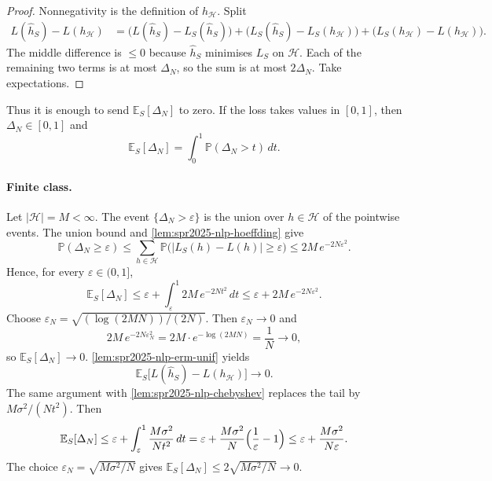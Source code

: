 \documentclass[11pt,a4paper]{article}
\theoremstyle{definition}
\begin{document}
\begin{proof}
Nonnegativity is the definition of \(h_{\mathcal{H}}\). Split
\begin{align*}
L(\widehat h_S)-L(h_{\mathcal{H}})
&=
\bigl(L(\widehat h_S)-L_S(\widehat h_S)\bigr)
+\bigl(L_S(\widehat h_S)-L_S(h_{\mathcal{H}})\bigr)
+\bigl(L_S(h_{\mathcal{H}})-L(h_{\mathcal{H}})\bigr).
\end{align*}
The middle difference is \(\le 0\) because \(\widehat h_S\) minimises \(L_S\) on \(\mathcal{H}\). Each of the remaining two terms is at most \(\Delta_N\), so the sum is at most \(2\Delta_N\). Take expectations.
\end{proof}

Thus it is enough to send \(\mathbb{E}_S[\Delta_N]\) to zero. If the loss takes values in \([0,1]\), then \(\Delta_N\in[0,1]\) and
\[
\mathbb{E}_S[\Delta_N]
=\int_0^1\mathbb{P}(\Delta_N>t)\,dt.
\]

\paragraph{Finite class.}
Let \(\lvert\mathcal{H}\rvert=M<\infty\). The event \(\{\Delta_N>\varepsilon\}\) is the union over \(h\in\mathcal{H}\) of the pointwise events. The union bound and \cref{lem:spr2025-nlp-hoeffding} give
\[
\mathbb{P}(\Delta_N\ge\varepsilon)
\le
\sum_{h\in\mathcal{H}}\mathbb{P}\bigl(\lvert L_S(h)-L(h)\rvert\ge\varepsilon\bigr)
\le
2M\,e^{-2N\varepsilon^2}.
\]
Hence, for every \(\varepsilon\in(0,1]\),
\[
\mathbb{E}_S[\Delta_N]
\le
\varepsilon+\int_{\varepsilon}^1 2M\,e^{-2Nt^2}\,dt
\le
\varepsilon+2M\,e^{-2N\varepsilon^2}.
\]
Choose \(\varepsilon_N=\sqrt{(\log(2MN))/(2N)}\). Then \(\varepsilon_N\to 0\) and
\[
2M\,e^{-2N\varepsilon_N^2}
=2M\cdot e^{-\log(2MN)}
=\frac{1}{N}\to 0,
\]
so \(\mathbb{E}_S[\Delta_N]\to 0\). \cref{lem:spr2025-nlp-erm-unif} yields
\[
\mathbb{E}_S\bigl[L(\widehat h_S)-L(h_{\mathcal{H}})\bigr]\to 0.
\]
The same argument with \cref{lem:spr2025-nlp-chebyshev} replaces the tail by \(M\sigma^2/(N t^2)\). Then
\[
\mathbb{E}_S[\Delta_N]
\le
\varepsilon+\int_{\varepsilon}^1\frac{M\sigma^2}{Nt^2}\,dt
=\varepsilon+\frac{M\sigma^2}{N}\Bigl(\frac{1}{\varepsilon}-1\Bigr)
\le
\varepsilon+\frac{M\sigma^2}{N\varepsilon}.
\]
The choice \(\varepsilon_N=\sqrt{M\sigma^2/N}\) gives \(\mathbb{E}_S[\Delta_N]\le 2\sqrt{M\sigma^2/N}\to 0\).
\end{document}
